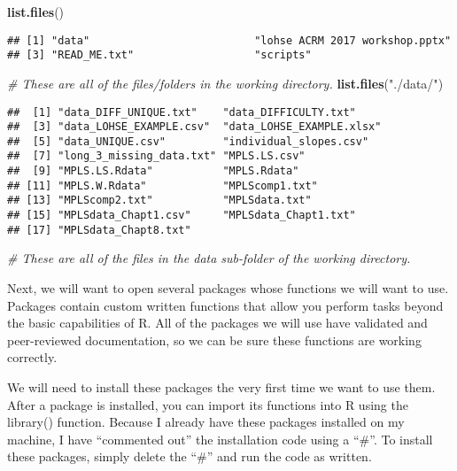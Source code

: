 \documentclass[]{article}
\newenvironment{Shaded}{\begin{snugshade}}{\end{snugshade}}
\newcommand{\KeywordTok}[1]{\textcolor[rgb]{0.13,0.29,0.53}{\textbf{{#1}}}}
\newcommand{\StringTok}[1]{\textcolor[rgb]{0.31,0.60,0.02}{{#1}}}
\newcommand{\CommentTok}[1]{\textcolor[rgb]{0.56,0.35,0.01}{\textit{{#1}}}}
\newcommand{\NormalTok}[1]{{#1}}
\begin{document}
\begin{Shaded}
\begin{Highlighting}[]
\KeywordTok{list.files}\NormalTok{()}
\end{Highlighting}
\end{Shaded}

\begin{verbatim}
## [1] "data"                          "lohse ACRM 2017 workshop.pptx"
## [3] "READ_ME.txt"                   "scripts"
\end{verbatim}

\begin{Shaded}
\begin{Highlighting}[]
\CommentTok{# These are all of the files/folders in the working directory.}
\KeywordTok{list.files}\NormalTok{(}\StringTok{"./data/"}\NormalTok{)}
\end{Highlighting}
\end{Shaded}

\begin{verbatim}
##  [1] "data_DIFF_UNIQUE.txt"    "data_DIFFICULTY.txt"    
##  [3] "data_LOHSE_EXAMPLE.csv"  "data_LOHSE_EXAMPLE.xlsx"
##  [5] "data_UNIQUE.csv"         "individual_slopes.csv"  
##  [7] "long_3_missing_data.txt" "MPLS.LS.csv"            
##  [9] "MPLS.LS.Rdata"           "MPLS.Rdata"             
## [11] "MPLS.W.Rdata"            "MPLScomp1.txt"          
## [13] "MPLScomp2.txt"           "MPLSdata.txt"           
## [15] "MPLSdata_Chapt1.csv"     "MPLSdata_Chapt1.txt"    
## [17] "MPLSdata_Chapt8.txt"
\end{verbatim}

\begin{Shaded}
\begin{Highlighting}[]
\CommentTok{# These are all of the files in the data sub-folder of the working directory.}
\end{Highlighting}
\end{Shaded}

Next, we will want to open several packages whose functions we will want
to use. Packages contain custom written functions that allow you perform
tasks beyond the basic capabilities of R. All of the packages we will
use have validated and peer-reviewed documentation, so we can be sure
these functions are working correctly.

We will need to install these packages the very first time we want to
use them. After a package is installed, you can import its functions
into R using the library() function. Because I already have these
packages installed on my machine, I have ``commented out'' the
installation code using a ``\#''. To install these packages, simply
delete the ``\#'' and run the code as written.
\end{document}

